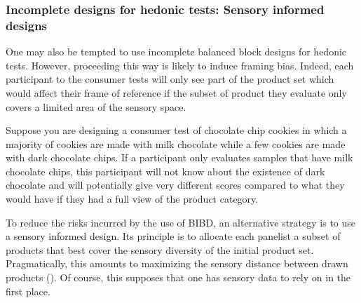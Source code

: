\documentclass[
]{book}
\begin{document}
\hypertarget{incomplete-designs-for-hedonic-tests-sensory-informed-designs}{%
\subsubsection{Incomplete designs for hedonic tests: Sensory informed designs}\label{incomplete-designs-for-hedonic-tests-sensory-informed-designs}}

One may also be tempted to use incomplete balanced block designs for hedonic tests. However, proceeding this way is likely to induce framing bias. Indeed, each participant to the consumer tests will only see part of the product set which would affect their frame of reference if the subset of product they evaluate only covers a limited area of the sensory space.

Suppose you are designing a consumer test of chocolate chip cookies in which a majority of cookies are made with milk chocolate while a few cookies are made with dark chocolate chips. If a participant only evaluates samples that have milk chocolate chips, this participant will not know about the existence of dark chocolate and will potentially give very different scores compared to what they would have if they had a full view of the product category.

To reduce the risks incurred by the use of BIBD, an alternative strategy is to use a sensory informed design. Its principle is to allocate each panelist a subset of products that best cover the sensory diversity of the initial product set. Pragmatically, this amounts to maximizing the sensory distance between drawn products (\citet{Franczak2015}). Of course, this supposes that one has sensory data to rely on in the first place.
\end{document}
